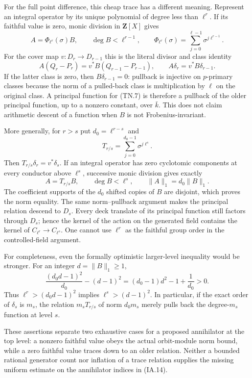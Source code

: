 For the full point difference, this cheap trace has a different
meaning. Represent an integral operator by its unique polynomial of
degree less than $\ell^r$. If its faithful value is zero, monic
division in $\mathbf Z[X]$ gives
\[
 A=\Phi_{\ell^r}(\sigma)B,\qquad
 \deg B<\ell^{r-1},\qquad
 \Phi_{\ell^r}(\sigma)=\sum_{j=0}^{\ell-1}
                                      \sigma^{j\ell^{r-1}}.
\tag{TN.6}
\]
For the cover map $v:D_r\to D_{r-1}$ this is the literal divisor
and class identity
\[
 A(Q_r-P_r)=v^*B(Q_{r-1}-P_{r-1}),\qquad
 A\delta_r=v^*B\delta_{r-1}.
\tag{TN.7}
\]
If the latter class is zero, then $B\delta_{r-1}=0$: pullback is
injective on $p$-primary classes because the norm of a pulled-back class
is multiplication by $\ell$ on the original class. A principal function for (TN.7) is
therefore a pullback of the older principal function, up to a
nonzero constant, over $\bar k$. This does not claim arithmetic
descent of a function when $B$ is not Frobenius-invariant.

More generally, for $r>s$ put $d_0=\ell^{r-s}$ and
\[
                 T_{r/s}=\sum_{j=0}^{d_0-1}\sigma^{j\ell^s}.
\tag{TN.8}
\]
Then $T_{r/s}\delta_r=v^*\delta_s$. If an integral operator has
zero cyclotomic components at every conductor above $\ell^s$,
successive monic division gives exactly
\[
             A=T_{r/s}B,\qquad \deg B<\ell^s,
                         \qquad\|A\|_1=d_0\|B\|_1.
\tag{TN.9}
\]
The coefficient supports of the $d_0$ shifted copies of $B$ are
disjoint, which proves the norm equality. The same norm--pullback
argument makes the principal relation descend to $D_s$. Every
deck translate of its principal function still factors through
$D_s$; hence the kernel of the action on the generated field contains the
kernel of $C_{\ell^r}\to C_{\ell^s}$. One cannot use $\ell^r$ as the faithful
group order in the controlled-field argument.

For completeness, even the formally optimistic larger-level
inequality would be stronger. For an integer $d=\|B\|_1\ge1$,
\[
 \frac{(d_0d-1)^2}{d_0}-(d-1)^2
                    =(d_0-1)d^2-1+\frac1{d_0}>0.
\tag{TN.10}
\]
Thus $\ell^r>(d_0d-1)^2$ implies
$\ell^s>(d-1)^2$. In particular, if the exact order of $\delta_s$
is $m_s$, the relation $m_sT_{r/s}$ of norm $d_0m_s$ merely
pulls back the degree-$m_s$ function at level $s$.

These assertions separate two exhaustive cases for a proposed
annihilator at the top level: a nonzero faithful value obeys the
actual orbit-module norm bound, while a zero faithful value traces
down to an older relation. Neither a bounded rational generator
count nor inflation of a trace relation supplies the missing
uniform estimate on the annihilator indices in (IA.14).
